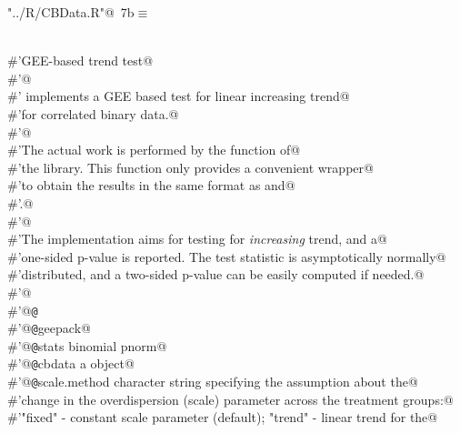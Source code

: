 \documentclass[reqno]{amsart}
\renewcommand{\NWtarget}[2]{\hypertarget{#1}{#2}}
\begin{document}
\begin{flushleft} \small\label{scrap12}\raggedright\small
\NWtarget{nuweb7b}{} \verb@"../R/CBData.R"@\nobreak\ {\footnotesize {7b}}$\equiv$
\vspace{-1ex}
\begin{list}{}{} \item
\mbox{}\verb@@\\
\mbox{}\verb@#'GEE-based trend test@\\
\mbox{}\verb@#'@\\
\mbox{}\verb@#' implements a GEE based test for linear increasing trend@\\
\mbox{}\verb@#'for correlated binary data.@\\
\mbox{}\verb@#'@\\
\mbox{}\verb@#'The actual work is performed by the  function of@\\
\mbox{}\verb@#'the  library. This function only provides a convenient wrapper@\\
\mbox{}\verb@#'to obtain the results in the same format as  and@\\
\mbox{}\verb@#'.@\\
\mbox{}\verb@#'@\\
\mbox{}\verb@#'The implementation aims for testing for \emph{increasing} trend, and a@\\
\mbox{}\verb@#'one-sided p-value is reported. The test statistic is asymptotically normally@\\
\mbox{}\verb@#'distributed, and a two-sided p-value can be easily computed if needed.@\\
\mbox{}\verb@#'@\\
\mbox{}\verb@#'@{\tt @}\verb@export@\\
\mbox{}\verb@#'@{\tt @}\verb@import geepack@\\
\mbox{}\verb@#'@{\tt @}\verb@importFrom stats binomial pnorm@\\
\mbox{}\verb@#'@{\tt @}\verb@param cbdata a  object@\\
\mbox{}\verb@#'@{\tt @}\verb@param scale.method character string specifying the assumption about the@\\
\mbox{}\verb@#'change in the overdispersion (scale) parameter across the treatment groups:@\\
\mbox{}\verb@#'"fixed" - constant scale parameter (default); "trend" - linear trend for the@\\

\end{list}
\end{flushleft}
\end{document}
